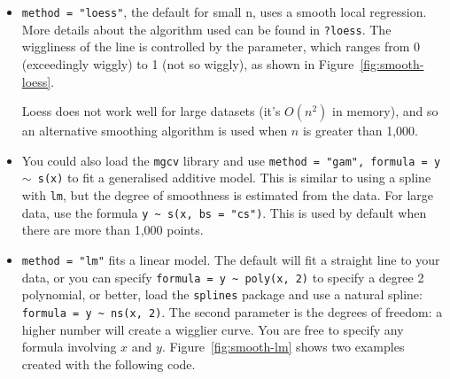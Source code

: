 \begin{itemize}
  \item {\tt method = "loess"}, the default for small n, uses a smooth local regression.  More details about the algorithm used can be found in {\tt ?loess}.  The wiggliness of the line is controlled by the  parameter, which ranges from 0 (exceedingly wiggly) to 1 (not so wiggly), as shown in Figure~\ref{fig:smooth-loess}.  
  
    
  
  \noindent Loess does not work well for large datasets (it's $O(n^2)$ in memory), and so an alternative smoothing algorithm is used when $n$ is greater than 1,000.

  \item You could also load the {\tt mgcv} library and use {\tt method = "gam", formula = y $\sim$ s(x)} to fit a generalised additive model. This is similar to using a spline with {\tt lm}, but the degree of smoothness is estimated from the data.  For large data, use the formula {\tt y \verb|~| s(x, bs = "cs")}.  This is used by default when there are more than 1,000 points.

    

  \item {\tt method = "lm"} fits a linear model.  The default will fit a straight line to your data, or you can specify {\tt formula = y \verb|~| poly(x, 2)} to specify a degree 2 polynomial, or better, load the {\tt splines} package and use a natural spline: {\tt formula = y \verb|~| ns(x, 2)}. The second parameter is the degrees of freedom: a higher number will create a wigglier curve. You are free to specify any formula involving $x$ and $y$.  Figure~\ref{fig:smooth-lm} shows two examples created with the following code.  


\end{itemize}

